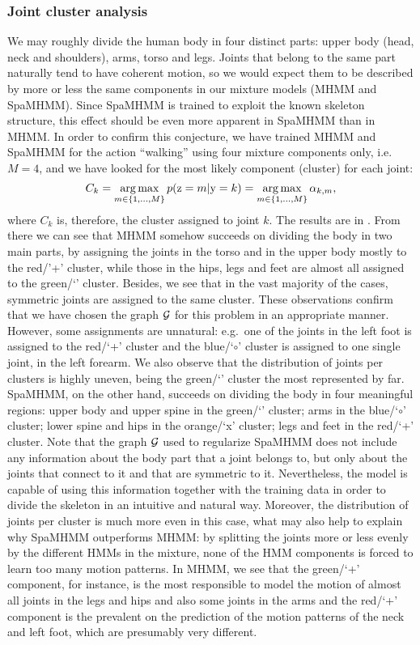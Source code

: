 \subsubsection{Joint cluster analysis}
\label{sec:spamhmm_cluster}
We may roughly divide the human body in four distinct parts: upper body (head, neck and shoulders), arms, torso and legs. Joints that belong to the same part naturally tend to have coherent motion, so we would expect them to be described by more or less the same components in our mixture models (MHMM and SpaMHMM). Since SpaMHMM is trained to exploit the known skeleton structure, this effect should be even more apparent in SpaMHMM than in MHMM. In order to confirm this conjecture, we have trained MHMM and SpaMHMM for the action ``walking'' using four mixture components only, i.e.\ $M=4$, and we have looked for the most likely component (cluster) for each joint:
\begin{equation}
C_k = \operatorname*{arg\,max}_{m \in \{1,\dots,M\}} p({\textnormal{z}}=m | {\textnormal{y}}=k) = \operatorname*{arg\,max}_{m \in \{1,\dots,M\}} \alpha_{k,m},
\end{equation}
where $C_k$ is, therefore, the cluster assigned to joint $k$. The results are in . From there we can see that MHMM somehow succeeds on dividing the body in two main parts, by assigning the joints in the torso and in the upper body mostly to the red/'+' cluster, while those in the hips, legs and feet are almost all assigned to the green/`\SmallTriangleUp' cluster. Besides, we see that in the vast majority of the cases, symmetric joints are assigned to the same cluster. These observations confirm that we have chosen the graph ${\mathcal{G}}$ for this problem in an appropriate manner. However, some assignments are unnatural: e.g.\  one of the joints in the left foot is assigned to the red/`+' cluster and the blue/`$\circ$' cluster is assigned to one single joint, in the left forearm. We also observe that the distribution of joints per clusters is highly uneven, being the green/`\SmallTriangleUp' cluster the most represented by far. SpaMHMM, on the other hand, succeeds on dividing the body in four meaningful regions: upper body and upper spine in the green/`\SmallTriangleUp' cluster; arms in the blue/`$\circ$' cluster; lower spine and hips in the orange/`x' cluster; legs and feet in the red/`+' cluster. Note that the graph ${\mathcal{G}}$ used to regularize SpaMHMM does not include any information about the body part that a joint belongs to, but only about the joints that connect to it and that are symmetric to it. Nevertheless, the model is capable of using this information together with the training data in order to divide the skeleton in an intuitive and natural way. Moreover, the distribution of joints per cluster is much more even in this case, what may also help to explain why SpaMHMM outperforms MHMM: by splitting the joints more or less evenly by the different HMMs in the mixture, none of the HMM components is forced to learn too many motion patterns. In MHMM, we see that the green/`+' component, for instance, is the most responsible to model the motion of almost all joints in the legs and hips and also some joints in the arms and the red/`+' component is the prevalent on the prediction of the motion patterns of the neck and left foot, which are presumably very different.

